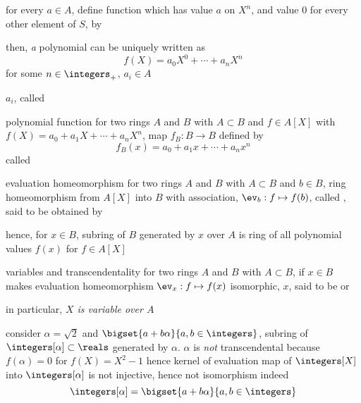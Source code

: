\documentclass[17pt,landscape]{foils}
\begin{document}
{\bit
\item
	for every $a\in A$,
	define function which has value $a$ on $X^n$, and value $0$ for every other element of $S$,
	by 
\item
	then, \emph{a} polynomial can be uniquely written as
	$$
		f(X) = a_0X^0 + \cdots + a_nX^n
	$$
	for some $n\in\integers_+$,
	$a_i\in A$

\vitem
	$a_i$, called 
\eit
\vfill



\begin{mydefinition}{polynomial function}%
	for two rings $A$ and $B$ with $A\subset B$
	and $f\in A[X]$ with $f(X) = a_0 + a_1 X + \cdots + a_nX^n$,
	map $f_B: B\to B$ defined by
	$$
		f_B(x) = a_0 + a_1 x + \cdots + a_n x^n
	$$
	called 
\end{mydefinition}

\begin{mydefinition}{evaluation homeomorphism}%
	for two rings $A$ and $B$ with $A\subset B$ and $b\in B$,
	ring homeomorphism from $A[X]$ into $B$
	with association, $\ev_b:f\mapsto f(b)$,
	called ,
	said to be obtained by 
\end{mydefinition}

\bit
\item
	hence, for $x\in B$, subring  of $B$
	generated by $x$ over $A$ is
	ring of all polynomial values $f(x)$ for $f\in A[X]$
\eit

\begin{mydefinition}{variables and transcendentality}%
	for two rings $A$ and $B$ with $A\subset B$,
	if $x\in B$ makes evaluation homeomorphism $\ev_x:f\mapsto f(x)$ isomorphic,
	$x$, said to be 
	or 
\end{mydefinition}

\bit
\item
	in particular, \emph{$X$ is variable over $A$}
\eit



\bit
\item
	consider $\alpha=\sqrt{2}$ and $\bigset{a+b\alpha}{a,b\in\integers}$,
	subring of $\integers[\alpha]\subset \reals$
	generated by $\alpha$.
	\bit
	\vitem
		$\alpha$ is \emph{not} transcendental
		because $f(\alpha)=0$ for $f(X)=X^2-1$
	\vitem
		hence kernel of evaluation map of $\integers[X]$ into $\integers[\alpha]$
		is not injective,
		hence not isomorphism
	\vitem
		indeed
		$$
			\integers[\alpha] = \bigset{a+b\alpha}{a,b\in\integers}
		$$
	\eit

}
\end{document}
